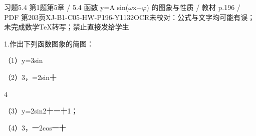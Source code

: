 \begin{bankitem}{习题5.4 第1题}{第5章 / 5.4 函数 y=A sin(\ensuremath{\omega}x+\ensuremath{\varphi}) 的图象与性质 / 教材 p.196 / PDF 第203页}{XJ-B1-C05-HW-P196-Y1132}{OCR未校对：公式与文字均可能有误；未完成数学TeX转写；禁止直接发给学生}
\begin{ocrdraft}
\par
1.作出下列函数图象的简图：
\par
（1）y=3sin
\par
（2）3，=2sin十
\par
4
\par
（3）y=2sin2十一十1；
\par
（4）3，一2cos一十
\end{ocrdraft}
\end{bankitem}
